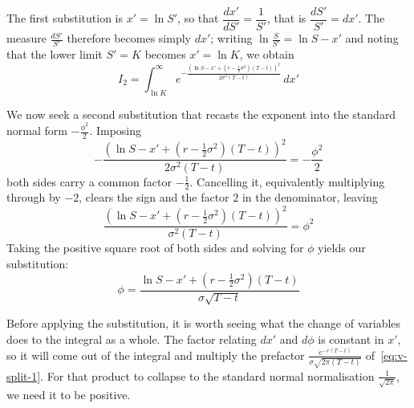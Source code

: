 \documentclass[a4paper,12pt]{article}
\numberwithin{equation}{section}
\begin{document}
The first substitution is $x' = \ln S'$, so that $\dfrac{dx'}{dS'} = \dfrac{1}{S'}$,
that is $\dfrac{dS'}{S'} = dx'$. The measure $\frac{dS'}{S'}$ therefore becomes
simply $dx'$; writing $\ln\frac{S}{S'} = \ln S - x'$ and noting that the lower
limit $S' = K$ becomes $x' = \ln K$, we obtain
\begin{equation}\label{eq:i2-x}
    I_2 = \int_{\ln K}^{\infty}
    e^{-\frac{\left(\ln S - x' + \left(r - \frac{1}{2}\sigma^2\right)(T-t)\right)^2}{2\sigma^2(T-t)}}
    \,dx'
\end{equation}

We now seek a second substitution that recasts the exponent into the standard
normal form $-\frac{\phi^2}{2}$. Imposing
\begin{equation}\label{eq:i2-setphi}
  -\frac{\left(\ln S - x' + \left(r - \frac{1}{2}\sigma^2\right)(T-t)\right)^2}{2\sigma^2(T-t)}
    = -\frac{\phi^2}{2}
\end{equation}
both sides carry a common factor $-\tfrac{1}{2}$. Cancelling it, equivalently
multiplying through by $-2$, clears the sign and the factor $2$ in the
denominator, leaving
\begin{equation}\label{eq:i2-sq}
  \frac{\left(\ln S - x' + \left(r - \frac{1}{2}\sigma^2\right)(T-t)\right)^2}{\sigma^2(T-t)}
    = \phi^2
\end{equation}
Taking the positive square root of both sides and solving for $\phi$ yields our
substitution:
\begin{equation}\label{eq:i2-phi}
  \phi = \frac{\ln S - x' + \left(r - \frac{1}{2}\sigma^2\right)(T-t)}{\sigma\sqrt{T-t}}
\end{equation}

Before applying the substitution, it is worth seeing what the change of variables
does to the integral as a whole. The factor relating $dx'$ and $d\phi$ is constant
in $x'$, so it will come out of the integral and multiply the prefactor
$\frac{e^{-r(T-t)}}{\sigma\sqrt{2\pi(T-t)}}$ of~\eqref{eq:v-split-1}. For that product
to collapse to the standard normal normalisation $\frac{1}{\sqrt{2\pi}}$, we need it to be positive.
\end{document}
